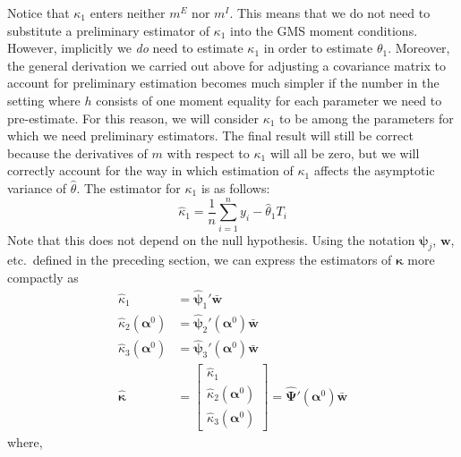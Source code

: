 \documentclass[12pt]{article}
\begin{document}
Notice that $\kappa_1$ enters neither $m^E$ nor $m^I$.
This means that we do not need to substitute a preliminary estimator of $\kappa_1$ into the GMS moment conditions.
However, implicitly we \emph{do} need to estimate $\kappa_1$ in order to estimate $\theta_1$.
Moreover, the general derivation we carried out above for adjusting a covariance matrix to account for preliminary estimation becomes much simpler if the number in the setting where $h$ consists of one moment equality for each parameter we need to pre-estimate. 
For this reason, we will consider $\kappa_1$ to be among the parameters for which we need preliminary estimators.
The final result will still be correct because the derivatives of $m$ with respect to $\kappa_1$ will all be zero, but we will correctly account for the way in which estimation of $\kappa_1$ affects the asymptotic variance of $\widehat{\theta}$.
The estimator for $\kappa_1$ is as follows:
\[
  \widehat{\kappa}_1 = \frac{1}{n} \sum_{i=1}^n y_i - \widehat{\theta}_1 T_i
\]
Note that this does not depend on the null hypothesis.
Using the notation $\boldsymbol{\psi}_j$, $\mathbf{w}$, etc.\ defined in the preceding section, we can express the estimators of $\boldsymbol{\kappa}$ more compactly as
\begin{align*}
  \widehat{\kappa}_1 &= \widehat{\boldsymbol{\psi}}_1' \bar{\mathbf{w}}\\
  \widehat{\kappa}_2(\boldsymbol{\alpha}^0) &= \widehat{\boldsymbol{\psi}}_2'(\boldsymbol{\alpha}^0) \bar{\mathbf{w}}\\
  \widehat{\kappa}_3(\boldsymbol{\alpha}^0) &= \widehat{\boldsymbol{\psi}}_3'(\boldsymbol{\alpha}^0) \bar{\mathbf{w}}\\
  \widehat{\boldsymbol{\kappa}} &= \left[
  \begin{array}{l}
    \widehat{\kappa}_1 \\
    \widehat{\kappa}_2(\boldsymbol{\alpha}^0)\\
    \widehat{\kappa}_3(\boldsymbol{\alpha}^0)
  \end{array}
\right] = \widehat{\boldsymbol{\Psi}}'(\boldsymbol{\alpha}^0) \bar{\mathbf{w}}
\end{align*}
where, 
\end{document}
